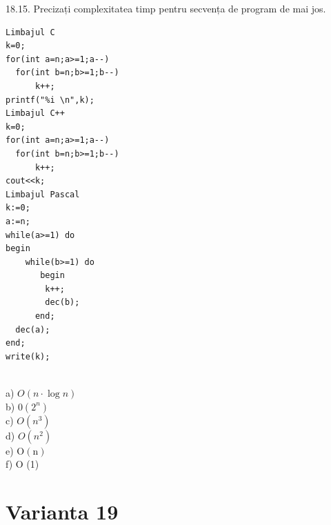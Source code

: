 {{18.15. Precizați complexitatea timp pentru secvența de program de mai jos.
\begin{verbatim}
Limbajul C 
k=0; 
for(int a=n;a>=1;a--) 
  for(int b=n;b>=1;b--) 
      k++; 
printf("%i \n",k);
Limbajul C++ 
k=0; 
for(int a=n;a>=1;a--) 
  for(int b=n;b>=1;b--) 
      k++; 
cout<<k;
Limbajul Pascal 
k:=0; 
a:=n; 
while(a>=1) do  
begin 
    while(b>=1) do 
       begin 
        k++;  
        dec(b); 
      end; 
  dec(a); 
end; 
write(k); 
\end{verbatim}
\\
a) $O(n \cdot \log n)$
\\
b) $0\left(2^{n}\right)$
\\
c) $O\left(n^{3}\right)$
\\
d) $O\left(n^{2}\right)$
\\
e) $\mathrm{O}(\mathrm{n})$
\\
f) O (1)
\\

\section*{Varianta 19}

}}
